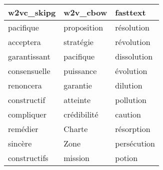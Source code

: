 \begin{tabular}{lll}
\toprule
   w2vc\_skipg &     w2v\_cbow &     fasttext \\
\midrule
    pacifique &  proposition &   résolution \\
    acceptera &    stratégie &   révolution \\
 garantissant &    pacifique &  dissolution \\
 consensuelle &    puissance &    évolution \\
    renoncera &     garantie &     dilution \\
  constructif &     atteinte &    pollution \\
   compliquer &  crédibilité &      caution \\
     remédier &       Charte &   résorption \\
      sincère &         Zone &  persécution \\
 constructifs &      mission &       potion \\
\bottomrule
\end{tabular}
